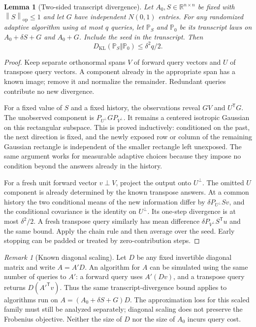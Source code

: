 \documentclass[11pt]{article}
\newtheorem{lemma}[theorem]{Lemma}
\theoremstyle{remark}
\newtheorem{remark}[theorem]{Remark}
\newcommand{\R}{\mathbb R}
\newcommand{\op}{\mathrm{op}}
\newcommand{\KL}{D_{\mathrm{KL}}}
\newcommand{\norm}[1]{\left\lVert #1\right\rVert}
\begin{document}
\begin{lemma}[Two-sided transcript divergence]\label{lem:rectkl}
Let $A_0,S\in\R^{n\times n}$ be fixed with $\norm S_\op\le1$ and let $G$
have independent $N(0,1)$ entries. For any randomized adaptive algorithm using
at most $q$ queries, let $\mathbb P_S$ and $\mathbb P_0$ be its transcript laws
on $A_0+\delta S+G$ and $A_0+G$. Include the seed in the transcript. Then
\begin{equation}\label{eq:rectkl}
 \KL(\mathbb P_S\Vert\mathbb P_0)\le\delta^2q/2.
\end{equation}
\end{lemma}
\begin{proof}
Keep separate orthonormal spans $V$ of forward query vectors and $U$ of
transpose query vectors. A component already in the appropriate span has a
known image; remove it and normalize the remainder. Redundant queries
contribute no new divergence.

For a fixed value of $S$ and a fixed history, the observations reveal $GV$ and
$U^{\mathsf T}G$. The unobserved component is
$P_{U^\perp}GP_{V^\perp}$. It remains a centered isotropic Gaussian on this
rectangular subspace. This is proved inductively: conditioned on the past,
the next direction is fixed, and the newly exposed row or column of the
remaining Gaussian rectangle is independent of the smaller rectangle left
unexposed. The same argument works for measurable adaptive choices because
they impose no condition beyond the answers already in the history.

For a fresh unit forward vector $v\perp V$, project the output onto
$U^\perp$. The omitted $U$ component is already determined by the known
transpose answers. At a common history the two conditional means of the
new information differ by $\delta P_{U^\perp}Sv$, and the conditional
covariance is the identity on $U^\perp$. Its one-step divergence is at most
$\delta^2/2$. A fresh transpose query similarly has mean difference
$\delta P_{V^\perp}S^{\mathsf T}u$ and the same bound. Apply the chain rule
and then average over the seed. Early stopping can be padded or treated by
zero-contribution steps.
\end{proof}

\begin{remark}[Known diagonal scaling]
Let $D$ be any fixed invertible diagonal matrix and write $A=A'D$.
An algorithm for $A$ can be simulated using the same number of queries to
$A'$: a forward query uses $A'(Dv)$, and a transpose query returns
$D(A'^{\mathsf T}v)$. Thus the same transcript-divergence bound applies to algorithms run on
$A=(A_0+\delta S+G)D$. The approximation loss for this scaled family must
still be analyzed separately; diagonal scaling does not preserve the
Frobenius objective. Neither the size of $D$ nor the size of $A_0$ incurs query
cost.
\end{remark}
\end{document}
